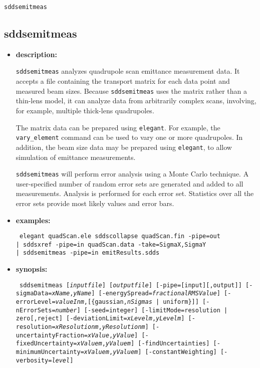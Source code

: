 \documentclass[11pt]{article}
\begin{document}
\begin{latexonly}
\newpage
\begin{center}{\Large\verb|sddsemitmeas|}\end{center}
\end{latexonly}
\subsection{sddsemitmeas}
\label{sddsemitmeas}

\begin{itemize}
\item {\bf description:} 

{\tt sddsemitmeas} analyzes quadrupole scan emittance measurement
data.  It accepts a file containing the transport matrix for each data
point and measured beam sizes.  Because {\tt sddsemitmeas} uses the
matrix rather than a thin-lens model, it can analyze data from
arbitrarily complex scans, involving, for example, multiple thick-lens
quadrupoles.

The matrix data can be prepared using {\tt elegant}.  For example, the
{\tt vary\_element} command can be used to vary one or more
quadrupoles.  In addition, the beam size data may be prepared using
{\tt elegant}, to allow simulation of emittance measurements.

{\tt sddsemitmeas} will perform error analysis using a Monte Carlo
technique.  A user-specified number of random error sets are generated
and added to all measurements.  Analysis is performed for each error
set.  Statistics over all the error sets provide most likely values
and error bars.

\item {\bf examples:}
\begin{flushleft}{\tt
elegant quadScan.ele
sddscollapse quadScan.fin -pipe=out \\
| sddsxref -pipe=in quadScan.data -take=SigmaX,SigmaY \\
| sddsemitmeas -pipe=in emitResults.sdds
}\end{flushleft}

\item {\bf synopsis:}
\begin{flushleft}{\tt
sddsemitmeas [{\em inputfile}] [{\em outputfile}] [-pipe=[input][,output]]
 [-sigmaData={\em xName},{\em yName}]
 [-energySpread={\em fractionalRMSValue}]
 [-errorLevel={\em valueInm},[\{gaussian,{\em nSigmas} | uniform\}]]
 [-nErrorSets={\em number}] [-seed=integer]
 [-limitMode={resolution | zero}[{,reject}]
 [-deviationLimit={\em xLevelm},{\em yLevelm}]
 [-resolution={\em xResolutionm},{\em yResolutionm}]
 [-uncertaintyFraction={\em xValue},{\em yValue}]
 [-fixedUncertainty={\em xValuem},{\em yValuem}]
 [-findUncertainties] [-minimumUncertainty={\em xValuem},{\em yValuem}]
 [-constantWeighting] [-verbosity={\em level}]
}\end{flushleft}


\end{itemize}
\end{document}
